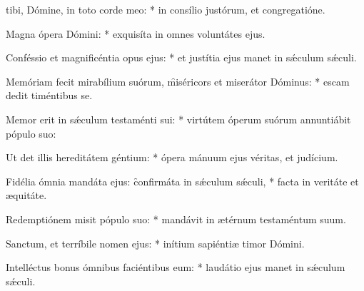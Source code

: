 \begin{psalmus}

     tibi, Dómine, in toto corde meo: * in consílio justórum, et congregatióne.

    Magna ópera Dómini: * exquisíta in omnes voluntátes ejus.

    Conféssio et magnificéntia opus ejus: * et justítia ejus manet in sǽculum sǽculi.

    Memóriam fecit mirabílium suórum, \f miséricors et miserátor Dóminus: * escam dedit timéntibus se.

    Memor erit in sǽculum testaménti sui: * virtútem óperum suórum annuntiábit pópulo suo:

    Ut det illis hereditátem géntium: * ópera mánuum ejus véritas, et judícium.

    Fidélia ómnia mandáta ejus: \f confirmáta in sǽculum sǽculi, * facta in veritáte et æquitáte.

    Redemptiónem misit pópulo suo: * mandávit in ætérnum testaméntum suum.

    Sanctum, et terríbile nomen ejus: * inítium sapiéntiæ timor Dómini.

    Intelléctus bonus ómnibus faciéntibus eum: * laudátio ejus manet in sǽculum sǽculi.

\end{psalmus}
